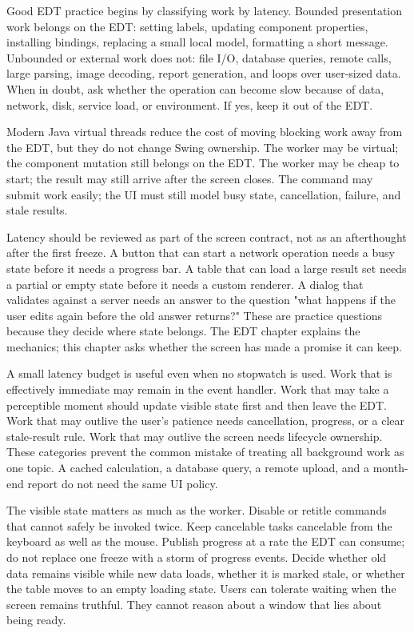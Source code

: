 Good EDT practice begins by classifying work by latency. Bounded presentation
work belongs on the EDT: setting labels, updating component properties,
installing bindings, replacing a small local model, formatting a short message.
Unbounded or external work does not: file I/O, database queries, remote calls,
large parsing, image decoding, report generation, and loops over user-sized
data. When in doubt, ask whether the operation can become slow because of data,
network, disk, service load, or environment. If yes, keep it out of the EDT.

Modern Java virtual threads reduce the cost of moving blocking work away from
the EDT, but they do not change Swing ownership. The worker may be virtual; the
component mutation still belongs on the EDT. The worker may be cheap to start;
the result may still arrive after the screen closes. The command may submit work
easily; the UI must still model busy state, cancellation, failure, and stale
results.

Latency should be reviewed as part of the screen contract, not as an afterthought
after the first freeze. A button that can start a network operation needs a
busy state before it needs a progress bar. A table that can load a large result
set needs a partial or empty state before it needs a custom renderer. A dialog
that validates against a server needs an answer to the question "what happens
if the user edits again before the old answer returns?" These are practice
questions because they decide where state belongs. The EDT chapter explains the
mechanics; this chapter asks whether the screen has made a promise it can keep.

A small latency budget is useful even when no stopwatch is used. Work that is
effectively immediate may remain in the event handler. Work that may take a
perceptible moment should update visible state first and then leave the EDT.
Work that may outlive the user's patience needs cancellation, progress, or a
clear stale-result rule. Work that may outlive the screen needs lifecycle
ownership. These categories prevent the common mistake of treating all
background work as one topic. A cached calculation, a database query, a remote
upload, and a month-end report do not need the same UI policy.

The visible state matters as much as the worker. Disable or retitle commands
that cannot safely be invoked twice. Keep cancelable tasks cancelable from the
keyboard as well as the mouse. Publish progress at a rate the EDT can consume;
do not replace one freeze with a storm of progress events. Decide whether old
data remains visible while new data loads, whether it is marked stale, or
whether the table moves to an empty loading state. Users can tolerate waiting
when the screen remains truthful. They cannot reason about a window that lies
about being ready.

